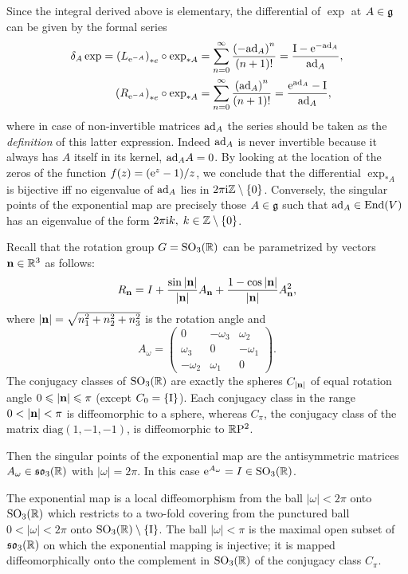 \begin{rem}
    Since the integral derived above is elementary, the differential of $\exp$ at $A\in\frakg$ can be given by the formal series
    \begin{align}
        \delta_A\exp= \left(L_{\rme^{-A}}\right)_{\ast e}\circ \exp_{\ast A}&=\sum_{n=0}^\infty \frac{\left(-\ad_{A}\right)^n}{(n+1)!}=\frac{\rmI-\rme^{-\ad_A}}{\ad_A},\\
        \left(R_{\rme^{-A}}\right)_{\ast e}\circ \exp_{\ast A}&=\sum_{n=0}^\infty \frac{\left(\ad_{A}\right)^n}{(n+1)!}=\frac{\rme^{\ad_A}-\rmI}{\ad_A},\label{dexp series}
    \end{align}
    where in case of non-invertible matrices $\ad_A$ the series should be taken as the \emph{definition} of this latter expression. Indeed $\ad_A$ is never invertible because it always has $A$ itself in its kernel, $\ad_A A=0$. By looking at the location of the zeros of the function $f(z)=(\rme^z-1)/z$, we conclude that the differential $\exp_{\ast A}$ is bijective iff no eigenvalue of $\ad_A$ lies in $2\pi \rmi\bbZ\setminus\{0\}$. Conversely, the singular points of the exponential map are precisely those $A\in \frakg$ such that $\ad_A\in \End(V)$ has an eigenvalue of the form $2\pi \rmi k,$ $k\in\bbZ\setminus\{0\}$.
\end{rem}

\begin{example}
    Recall that the rotation group $G=\SO_3(\bbR)$ can be parametrized by vectors $\bf{n}\in\bbR^3$ as follows:
    \[R_{\bf{n}}=I+\frac{\sin |\bf{n}|}{|\bf{n}|}A_{\bf{n}}+\frac{1-\cos |\bf{n}|}{|\bf{n}|}A_{\bf{n}}^2,\]
    where $|\bf{n}|=\sqrt{n_1^2+n_2^2+n_3^2}$ is the rotation angle and 
    \[A_\omega=\begin{pmatrix}
        0&-\omega_3&\omega_2\\
        \omega_3&0&-\omega_1\\
        -\omega_2&\omega_1&0
    \end{pmatrix}.\]
    The conjugacy classes of $\SO_3(\bbR)$ are exactly the spheres $C_{|\bf{n}|}$ of equal rotation angle $0\leq |\bf{n}|\leq \pi$ (except $C_0=\{\rmI\}$). Each conjugacy class in the range $0<|\bf{n}|<\pi$ is diffeomorphic to a sphere, whereas $C_\pi$, the conjugacy class of the matrix $\mathrm{diag}(1,-1,-1)$, is diffeomorphic to $\RP^2$.
    
    Then the singular points of the exponential map are the antisymmetric matrices $A_\omega\in \frakso_3(\bbR)$ with $|\omega|=2\pi$. In this case $\rme^{A_\omega}=I\in \SO_3(\bbR)$. 

    The exponential map is a local diffeomorphism from the ball $|\omega|<2\pi$ onto $\SO_3(\bbR)$ which restricts to a two-fold covering from the punctured ball $0<|\omega|<2\pi$ onto $\SO_3(\bbR)\setminus \{\rmI\}$. The ball $|\omega|<\pi$ is the maximal open subset of $\frakso_3(\bbR)$ on which the exponential mapping is injective; it is mapped diffeomorphically onto the complement in $\SO_3(\bbR)$ of the conjugacy class $C_\pi$.
\end{example}


